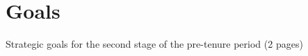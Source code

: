 \chapter{Goals}
\label{goals}

\vspace{-10mm}

Strategic goals for the second stage of the pre-tenure period (2 pages)


